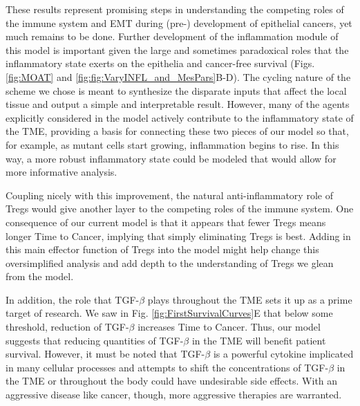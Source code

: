 \documentclass[11pt]{article}
\begin{document}
These results represent promising steps in understanding the competing roles of the immune system and EMT during (pre-) development of epithelial cancers, yet much remains to be done. Further development of the inflammation module of this model is important given the large and sometimes paradoxical roles that the inflammatory state exerts on the epithelia and cancer-free survival (Figs. \ref{fig:MOAT} and \ref{fig:fig:VaryINFL_and_MesPars}B-D).
The cycling nature of the scheme we chose is meant to synthesize the disparate inputs that affect the local tissue and output a simple and interpretable result.
However, many of the agents explicitly considered in the model actively contribute to the inflammatory state of the TME, providing a basis for connecting these two pieces of our model so that, for example, as mutant cells start growing, inflammation begins to rise.
In this way, a more robust inflammatory state could be modeled that would allow for more informative analysis.
\par
Coupling nicely with this improvement, the natural anti-inflammatory role of Tregs would give another layer to the competing roles of the immune system.
One consequence of our current model is that it appears that fewer Tregs means longer Time to Cancer, implying that simply eliminating Tregs is best.
Adding in this main effector function of Tregs into the model might help change this oversimplified analysis and add depth to the understanding of Tregs we glean from the model.
\par
In addition, the role that TGF-$\beta$ plays throughout the TME sets it up as a prime target of research.
We saw in Fig. \ref{fig:FirstSurvivalCurves}E that below some threshold, reduction of TGF-$\beta$ increases Time to Cancer.
Thus, our model suggests that reducing quantities of TGF-$\beta$ in the TME will benefit patient survival.
However, it must be noted that TGF-$\beta$ is a powerful cytokine implicated in many cellular processes and attempts to shift the concentrations of TGF-$\beta$ in the TME or throughout the body could have undesirable side effects.
With an aggressive disease like cancer, though, more aggressive therapies are warranted.
\par
\end{document}
